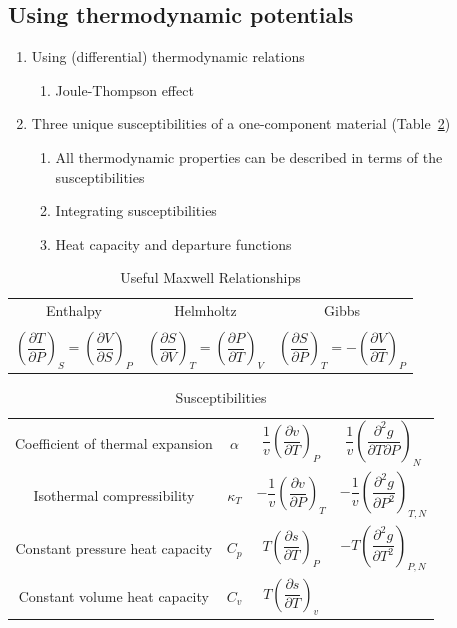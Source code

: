 \documentclass[11pt]{article}
\begin{document}
\subsection{Using thermodynamic potentials}
\label{sec:orgc501d77}
\begin{enumerate}
\item Using (differential) thermodynamic relations
\begin{enumerate}
\item Joule-Thompson effect
\end{enumerate}
\item Three unique susceptibilities of a one-component material (Table~\ref{susceptibilities})
\begin{enumerate}
\item All thermodynamic properties can be described in terms of the susceptibilities
\item Integrating susceptibilities
\item Heat capacity and departure functions
\end{enumerate}
\end{enumerate}
\begin{table}
  \begin{center}
  \caption{\label{Maxwell}Useful Maxwell Relationships}
  \begin{tabular}{ccc}
\hline
Enthalpy   & Helmholtz & Gibbs \\
 & & \\
$ \left ( \dfrac{\partial T}{\partial P}\right )_S =  \left ( \dfrac{\partial V}{\partial
    S}\right )_P  $ &
$ \left ( \dfrac{\partial S}{\partial V}\right )_T =  \left ( \dfrac{\partial P}{\partial
    T}\right )_V  $ &
$ \left ( \dfrac{\partial S}{\partial P}\right )_T =  -\left ( \dfrac{\partial V}{\partial
    T}\right )_P  $ \\
\hline
  \end{tabular}
  \end{center}
\end{table}
\begin{table}
  \begin{center}
  \caption{\label{susceptibilities}Susceptibilities}
  \begin{tabular}{cccc}
\hline
    Coefficient of thermal expansion & $\alpha$ &  $\dfrac{1}{v} \left (
      \dfrac{\partial v}{\partial T} \right )_P$  & $\dfrac{1}{v} \left (
      \dfrac{\partial^2 g}{\partial T \partial P} \right )_N$\\
  Isothermal compressibility   & $\kappa_T$  & $-\dfrac{1}{v} \left (
      \dfrac{\partial v}{\partial P} \right )_T$ & $-\dfrac{1}{v} \left (
      \dfrac{\partial^2 g}{\partial P^2} \right )_{T,N}$\\
  Constant  pressure heat capacity & $C_p$ & $ T \left ( \dfrac{\partial
      s}{\partial T}\right )_P $ & $-T \left (
      \dfrac{\partial^2 g}{\partial T^2} \right )_{P,N}$\\
  Constant  volume heat capacity & $C_v$ & $ T \left ( \dfrac{\partial
      s}{\partial T}\right )_v $ & \\
\hline
  \end{tabular}
  \end{center}
\end{table}
\end{document}
